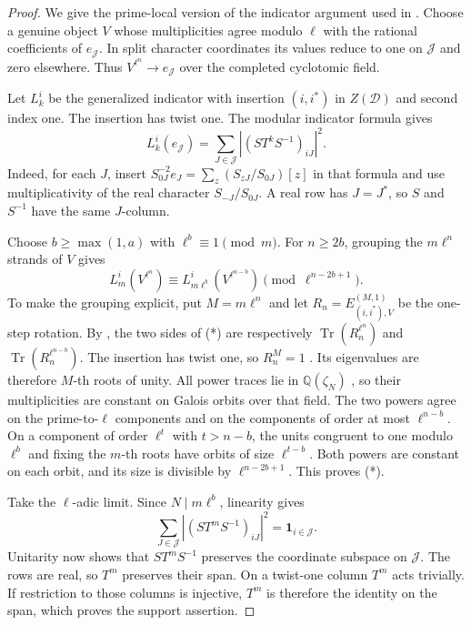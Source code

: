 \documentclass[11pt,a4paper]{article}
\numberwithin{equation}{section}
\begin{document}
\begin{proof}
We give the prime-local version of the indicator argument used in
\cite[Section~3]{Dyadic}. Choose a genuine object $V$ whose
multiplicities agree modulo $\ell$ with the rational coefficients of
$e_{\mathcal J}$. In split character coordinates its values reduce to
one on $\mathcal J$ and zero elsewhere. Thus
$V^{\ell^n}\to e_{\mathcal J}$ over the completed cyclotomic field.

Let $L_k^i$ be the generalized indicator with insertion $(i,i^*)$ in
$Z(\mathcal D)$ and second index one. The insertion has twist one.
The modular indicator formula \cite[Proposition~6.1]{NS} gives
\[
 L_k^i(e_{\mathcal J})
   =\sum_{J\in\mathcal J}|(ST^kS^{-1})_{iJ}|^2.
\]
Indeed, for each $J$, insert
$S_{0J}^{-2}e_J=\sum_z(S_{zJ}/S_{0J})[z]$ in that formula and use
multiplicativity of the real character $S_{-J}/S_{0J}$. A real row
has $J=J^*$, so $S$ and $S^{-1}$ have the same $J$-column.

Choose $b\ge\max(1,a)$ with $\ell^b\equiv1\pmod m$.
For $n\ge2b$, grouping the $m\ell^n$ strands of $V$ gives
\[
 L_m^i(V^{\ell^n})\equiv
 L_{m\ell^b}^i(V^{\ell^{n-b}})
                         \pmod{\ell^{n-2b+1}}.             \tag{*}
\]
To make the grouping explicit, put $M=m\ell^n$ and let
$R_n=E^{(M,1)}_{(i,i^*),V}$ be the one-step rotation. By
\cite[Lemma~2.5 and Proposition~2.8(ii)]{NS}, the two sides of (*)
are respectively $\operatorname{Tr}(R_n^{\ell^n})$ and
$\operatorname{Tr}(R_n^{\ell^{n-b}})$.
The insertion has twist one, so $R_n^M=1$
\cite[Lemma~2.7]{NS}. Its eigenvalues are therefore $M$-th roots
of unity. All power traces lie in $\mathbb Q(\zeta_N)$
\cite[Proposition~5.7]{NS}, so their multiplicities are constant
on Galois orbits over that field.
The two powers agree on the prime-to-$\ell$ components and on the
components of order at most $\ell^{n-b}$. On a component of order
$\ell^t$ with $t>n-b$, the units congruent to one modulo $\ell^b$
and fixing the $m$-th roots have orbits of size $\ell^{t-b}$.
Both powers are constant on each orbit, and its size is divisible
by $\ell^{n-2b+1}$. This proves (*).

Take the $\ell$-adic limit. Since $N\mid m\ell^b$, linearity gives
\[
 \sum_{J\in\mathcal J}|(ST^mS^{-1})_{iJ}|^2
                          =\mathbf1_{i\in\mathcal J}.
\]
Unitarity now shows that $ST^mS^{-1}$ preserves the coordinate
subspace on $\mathcal J$. The rows are real, so $T^m$ preserves
their span. On a twist-one column $T^m$ acts trivially. If restriction
to those columns is injective, $T^m$ is therefore the identity on
the span, which proves the support assertion.
\end{proof}
\end{document}
